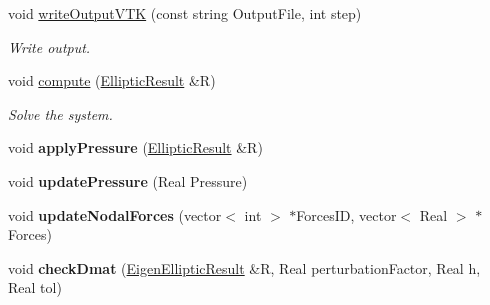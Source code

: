 \begin{DoxyCompactItemize}
\item 
\hypertarget{classvoom_1_1_mechanics_model_aa93918325d4e859b84d5d94b48a1ee0a}{
void \hyperlink{classvoom_1_1_mechanics_model_aa93918325d4e859b84d5d94b48a1ee0a}{writeOutputVTK} (const string OutputFile, int step)}
\label{classvoom_1_1_mechanics_model_aa93918325d4e859b84d5d94b48a1ee0a}

\begin{DoxyCompactList}\small\item\em Write output. \item\end{DoxyCompactList}\item 
\hypertarget{classvoom_1_1_mechanics_model_af61f345ea01fad5a81546b7511a7dada}{
void \hyperlink{classvoom_1_1_mechanics_model_af61f345ea01fad5a81546b7511a7dada}{compute} (\hyperlink{structvoom_1_1_elliptic_result}{EllipticResult} \&R)}
\label{classvoom_1_1_mechanics_model_af61f345ea01fad5a81546b7511a7dada}

\begin{DoxyCompactList}\small\item\em Solve the system. \item\end{DoxyCompactList}\item 
\hypertarget{classvoom_1_1_mechanics_model_a43aef052a6592002c1ab4784b6e65090}{
void {\bfseries applyPressure} (\hyperlink{structvoom_1_1_elliptic_result}{EllipticResult} \&R)}
\label{classvoom_1_1_mechanics_model_a43aef052a6592002c1ab4784b6e65090}

\item 
\hypertarget{classvoom_1_1_mechanics_model_abcabd201faad5676e8d9e3a540bf9279}{
void {\bfseries updatePressure} (Real Pressure)}
\label{classvoom_1_1_mechanics_model_abcabd201faad5676e8d9e3a540bf9279}

\item 
\hypertarget{classvoom_1_1_mechanics_model_ae8dfa2ea6eb9f08971389465bd477709}{
void {\bfseries updateNodalForces} (vector$<$ int $>$ $\ast$ForcesID, vector$<$ Real $>$ $\ast$Forces)}
\label{classvoom_1_1_mechanics_model_ae8dfa2ea6eb9f08971389465bd477709}

\item 
\hypertarget{classvoom_1_1_mechanics_model_a5523c57bc22db1193a3dd52edd46d1bc}{
void {\bfseries checkDmat} (\hyperlink{structvoom_1_1_eigen_elliptic_result}{EigenEllipticResult} \&R, Real perturbationFactor, Real h, Real tol)}
\label{classvoom_1_1_mechanics_model_a5523c57bc22db1193a3dd52edd46d1bc}

\end{DoxyCompactItemize}
